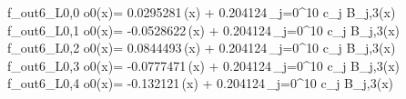 f_{out6_L0,0	o0}(x)= 0.0295281\,\phi(x) + 0.204124\,\sum_{j=0}^{10} c_j B_{j,3}(x)
f_{out6_L0,1	o0}(x)= -0.0528622\,\phi(x) + 0.204124\,\sum_{j=0}^{10} c_j B_{j,3}(x)
f_{out6_L0,2	o0}(x)= 0.0844493\,\phi(x) + 0.204124\,\sum_{j=0}^{10} c_j B_{j,3}(x)
f_{out6_L0,3	o0}(x)= -0.0777471\,\phi(x) + 0.204124\,\sum_{j=0}^{10} c_j B_{j,3}(x)
f_{out6_L0,4	o0}(x)= -0.132121\,\phi(x) + 0.204124\,\sum_{j=0}^{10} c_j B_{j,3}(x)
